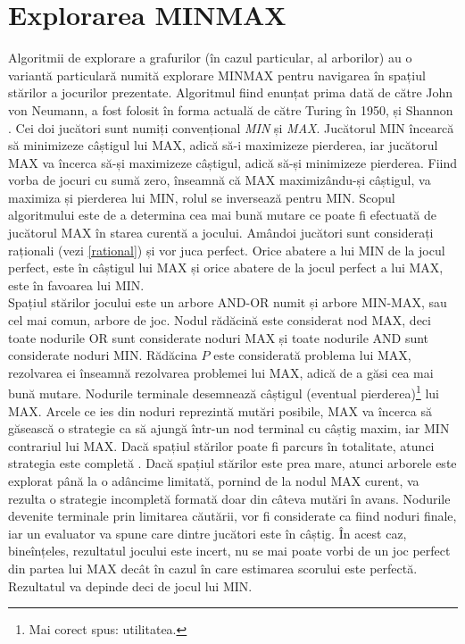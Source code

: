 \documentclass[12pt,twoside,a4paper,fleqn]{book}
\theoremstyle{definition}
\begin{document}
\section{Explorarea MINMAX}
Algoritmii de explorare a grafurilor (în cazul particular, al arborilor) au o variantă particulară numită explorare MINMAX pentru navigarea în spațiul stărilor a jocurilor prezentate. Algoritmul fiind enunțat prima dată de către John von Neumann, a fost folosit în forma actuală de către Turing în 1950, și Shannon \cite{shannon}. Cei doi jucători sunt numiți convențional \emph{MIN} și \emph{MAX}. Jucătorul MIN încearcă să minimizeze câștigul lui MAX, adică să-i maximizeze pierderea, iar jucătorul MAX va încerca să-și maximizeze câștigul, adică să-și minimizeze pierderea. Fiind vorba de jocuri cu sumă zero, înseamnă că MAX maximizându-și câștigul, va maximiza și pierderea lui MIN, rolul se inversează pentru MIN. Scopul algoritmului este de a determina cea mai bună mutare ce poate fi efectuată de jucătorul MAX în starea curentă a jocului. Amândoi jucători sunt considerați raționali (vezi \ref{rational}) și vor juca perfect. Orice abatere a lui MIN de la jocul perfect, este în câștigul lui MAX și orice abatere de la jocul perfect a lui MAX, este în favoarea lui MIN.\\
Spațiul stărilor jocului este un arbore AND-OR numit și arbore MIN-MAX, sau cel mai comun, arbore de joc. Nodul rădăcină este considerat nod MAX, deci toate nodurile OR sunt considerate noduri MAX și toate nodurile AND sunt considerate noduri MIN. Rădăcina $P$ este considerată problema lui MAX, rezolvarea ei înseamnă rezolvarea problemei lui MAX, adică de a găsi cea mai bună mutare. Nodurile terminale desemnează câștigul (eventual pierderea)\footnote{Mai corect spus: utilitatea.} lui MAX. Arcele ce ies din noduri reprezintă mutări posibile, MAX va încerca să găsească o strategie ca să ajungă într-un nod terminal cu câștig maxim, iar MIN contrariul lui MAX. Dacă spațiul stărilor poate fi parcurs în totalitate, atunci strategia este completă \cite{giumale}. Dacă spațiul stărilor este prea mare, atunci arborele este explorat până la o adâncime limitată, pornind de la nodul MAX curent, va rezulta o strategie incompletă formată doar din câteva mutări în avans. Nodurile devenite terminale prin limitarea căutării, vor fi considerate ca fiind noduri finale, iar un evaluator va spune care dintre jucători este în câștig. În acest caz, bineînțeles, rezultatul jocului este incert, nu se mai poate vorbi de un joc perfect din partea lui MAX decât în cazul în care estimarea scorului este perfectă. Rezultatul va depinde deci de jocul lui MIN.
\end{document}
